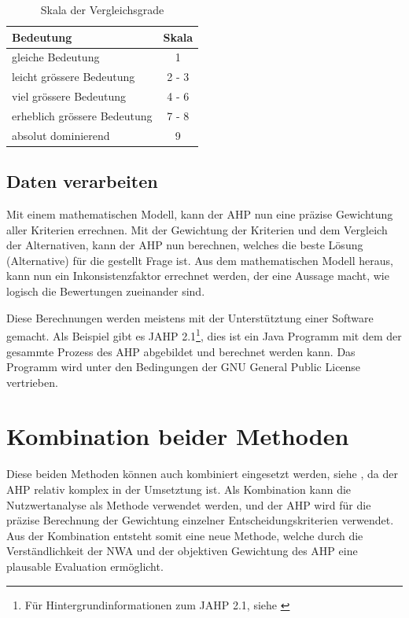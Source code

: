   \begin{table}[ht]
    \sffamily 
    \begin{center}
      \begin{tabular}{lc}
        \toprule
        \textbf{Bedeutung} & \textbf{Skala}\\
        \midrule
        gleiche Bedeutung & 1\\
        leicht grössere Bedeutung & 2 - 3\\
        viel grössere Bedeutung & 4 - 6\\
        erheblich grössere Bedeutung & 7 - 8\\
        absolut dominierend & 9\\
        \bottomrule
      \end{tabular}
      \caption{Skala der Vergleichsgrade}
      \label{tab:vergleichsgrade}
    \end{center}
  \end{table}
    
  \subsection{Daten verarbeiten}
  
  Mit einem mathematischen Modell, kann der \ac{AHP} nun eine präzise Gewichtung
  aller Kriterien errechnen. Mit der Gewichtung der Kriterien und dem Vergleich
  der Alternativen, kann der \ac{AHP} nun berechnen, welches die beste Lösung
  (Alternative) für die gestellt Frage ist. Aus dem mathematischen Modell
  heraus, kann nun ein Inkonsistenzfaktor errechnet werden, der eine Aussage
  macht, wie logisch die Bewertungen zueinander sind.
  
  Diese Berechnungen werden meistens mit der Unterstütztung einer Software
  gemacht. Als Beispiel gibt es JAHP 2.1\footnote{Für Hintergrundinformationen
  zum JAHP 2.1, siehe \cite{JAHP}}, dies ist ein Java Programm mit dem der
  gesammte Prozess des \ac{AHP} abgebildet und berechnet werden kann. Das
  Programm wird unter den Bedingungen der GNU General Public License
  vertrieben.
    
  \section{Kombination beider Methoden}
  
  Diese beiden Methoden können auch kombiniert eingesetzt werden, siehe
  \cite{AhpNwaKombination}, da der \ac{AHP} relativ komplex in der Umsetztung
  ist. Als Kombination kann die Nutzwertanalyse als Methode verwendet werden,
  und der \ac{AHP} wird für die präzise Berechnung der Gewichtung einzelner
  Entscheidungskriterien verwendet. Aus der Kombination entsteht somit eine
  neue Methode, welche durch die Verständlichkeit der \ac{NWA} und der
  objektiven Gewichtung des \ac{AHP} eine plausable Evaluation ermöglicht.
  
